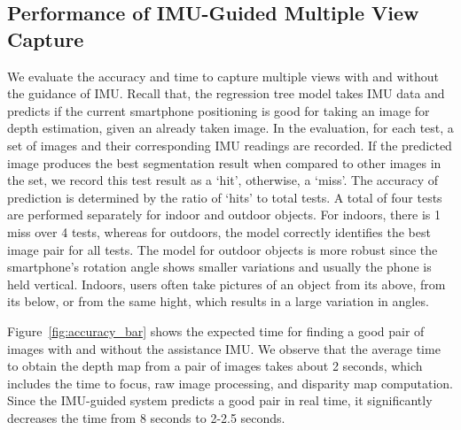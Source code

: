 
\subsection{Performance of IMU-Guided Multiple View Capture}

We evaluate the accuracy and time to capture multiple views with and without the guidance of IMU. Recall that, the regression tree model takes IMU data and predicts if the current smartphone positioning is good for taking an image for depth estimation, given an already taken image. In the evaluation, for each test, a set of images and their corresponding IMU readings are recorded. If the predicted image produces the best segmentation result when compared to other images in the set, we record this test result as a `hit', otherwise, a `miss'. The accuracy of prediction is determined by the ratio of `hits' to total tests. A total of four tests are performed separately for indoor and outdoor objects. For indoors, there is 1 miss over 4 tests, whereas for outdoors, the model correctly identifies the best image pair for all tests. The model for outdoor objects is more robust since the smartphone's rotation angle shows smaller variations and usually the phone is held vertical. Indoors, users often take pictures of an object from its above, from its below, or from the same hight, which results in a large variation in angles.


Figure~\ref{fig:accuracy_bar} shows the expected time for finding a good pair of images with and without the assistance IMU. We observe that the average time to obtain the depth map from a pair of images takes about 2 seconds, which includes the time to focus, raw image processing, and disparity map computation. Since the IMU-guided system predicts a good pair in real time, it significantly decreases the time from 8 seconds to 2-2.5 seconds.

